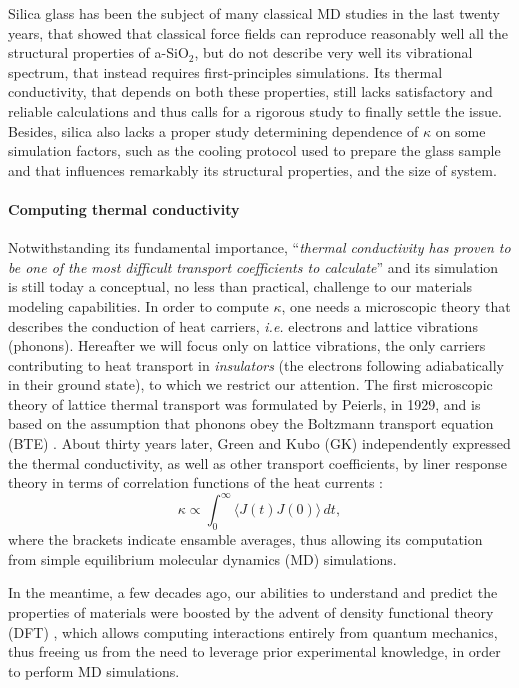 Silica glass has been the subject of many classical MD studies in the last twenty years, that showed that classical force fields can reproduce reasonably well all the structural properties of a-SiO$_2$, but do not describe very well its vibrational spectrum, that instead requires first-principles simulations. 
Its thermal conductivity, that depends on both these properties, still lacks satisfactory and reliable calculations and thus calls for a rigorous study to finally settle the issue. 
Besides, silica also lacks a proper study determining dependence of $\kappa$ on some simulation factors, such as the cooling protocol used to prepare the glass sample and that influences remarkably its structural properties, and the size of system. 


\paragraph{Computing thermal conductivity}
Notwithstanding its fundamental importance, ``\emph{thermal conductivity has proven to be one of the most difficult transport coefficients to calculate}'' \cite{Evans1990} and its simulation is still today a conceptual, no less than practical, challenge to our materials modeling capabilities. 
In order to compute $\kappa$, one needs a microscopic theory that describes the conduction of heat carriers, \emph{i.e.} electrons and lattice vibrations (phonons). Hereafter we will focus only on lattice vibrations, the only carriers contributing to heat transport in \emph{insulators} (the electrons following adiabatically in their ground state), to which we restrict our attention. 
The first microscopic theory of lattice thermal transport was formulated by Peierls, in 1929, and is based on the assumption that phonons obey the Boltzmann transport equation (BTE) \cite{Peierls1929}. 
About thirty years later, Green and Kubo (GK) independently expressed the thermal conductivity, as well as other transport coefficients, by liner response theory in terms of correlation functions of the heat currents \cite{Green1952,Green1954,Kubo1957a,Kubo1957b,Zwanzig1965}:
\begin{equation}
    \kappa \propto \int_{0}^{\infty}\!\langle{J}(t){J}(0)\rangle\, dt, \label{eq:GK-intro}
\end{equation}
where the brackets indicate ensamble averages, thus allowing its computation from simple equilibrium molecular dynamics (MD) simulations. 

In the meantime, a few decades ago, our abilities to understand and predict the properties of materials were boosted by the advent of density functional theory (DFT) \cite{Hohenberg1964,Kohn1965,Martin2008}, which allows computing interactions entirely from quantum mechanics, thus freeing us from the need to leverage prior experimental knowledge, in order to perform MD simulations. 

